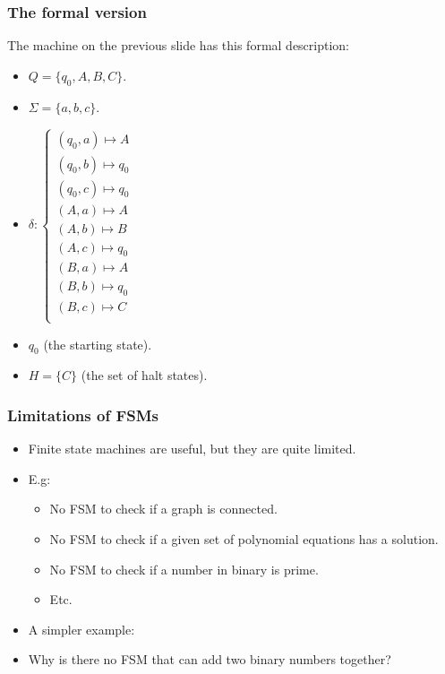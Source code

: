 \documentclass[handout]{beamer}
\begin{document}
\begin{frame}
\frametitle{The formal version}
The machine on the previous slide has this formal description:
\begin{itemize}
\item $Q=\{q_0,A,B,C\}$.
\item $\Sigma=\{a,b,c\}$.
\item $\delta:\begin{cases}
(q_0,a)\mapsto A\\
(q_0,b)\mapsto q_0\\
(q_0,c)\mapsto q_0\\
(A,a)\mapsto A\\
(A,b)\mapsto B\\
(A,c)\mapsto q_0\\
(B,a)\mapsto A\\
(B,b)\mapsto q_0\\
(B,c)\mapsto C\\
 \end{cases}$
\item $q_0$ (the starting state).
\item $H=\{C\}$ (the set of halt states).
\end{itemize}
\end{frame}

\begin{frame}
\frametitle{Limitations of FSMs}
\begin{itemize}
\item Finite state machines are useful, but they are quite limited.
\vspace{0.4cm}
\item E.g: 
\begin{itemize}
\item No FSM to check if a graph is connected.
\item No FSM to check if a given set of polynomial equations has a solution.
\item No FSM to check if a number in binary is prime.
\item Etc.
\end{itemize}
\vspace{0.2cm}
\item A simpler example:
\vspace{0.2cm}
\item Why is there no FSM that can add two binary numbers together?
\end{itemize}
\end{frame}
\end{document}
